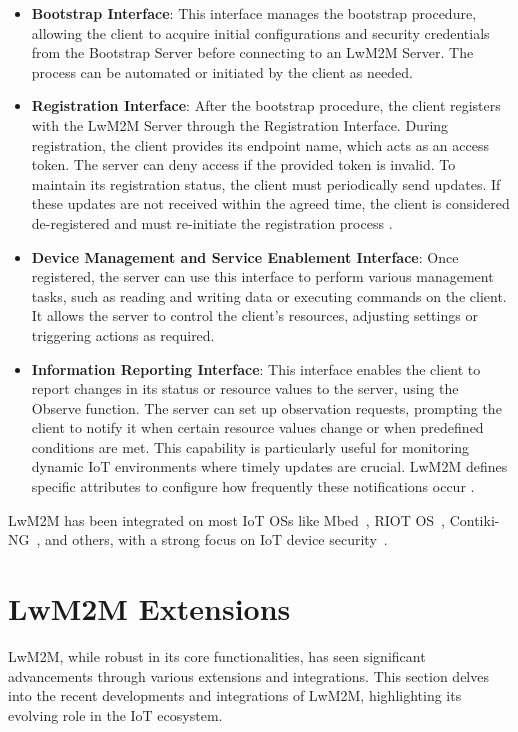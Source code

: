 \documentclass[11pt,sigconf]{iabart}
\begin{document}
\begin{itemize}
    \item \textbf{Bootstrap Interface}: This interface manages the bootstrap procedure, allowing the client to acquire initial configurations and security credentials from the Bootstrap Server before connecting to an LwM2M Server. The process can be automated or initiated by the client as needed.
    \item \textbf{Registration Interface}: After the bootstrap procedure, the client registers with the LwM2M Server through the Registration Interface. During registration, the client provides its endpoint name, which acts as an access token. The server can deny access if the provided token is invalid. To maintain its registration status, the client must periodically send updates. If these updates are not received within the agreed time, the client is considered de-registered and must re-initiate the registration process \cite{pop00006}.
    \item \textbf{Device Management and Service Enablement Interface}: Once registered, the server can use this interface to perform various management tasks, such as reading and writing data or executing commands on the client. It allows the server to control the client's resources, adjusting settings or triggering actions as required.
    \item \textbf{Information Reporting Interface}: This interface enables the client to report changes in its status or resource values to the server, using the Observe function. The server can set up observation requests, prompting the client to notify it when certain resource values change or when predefined conditions are met. This capability is particularly useful for monitoring dynamic IoT environments where timely updates are crucial. LwM2M defines specific attributes to configure how frequently these notifications occur \cite{pop00006}.
\end{itemize}

LwM2M has been integrated on most IoT OSs like Mbed~\cite{mbed}, RIOT OS~\cite{riot_os}, Contiki-NG~\cite{contiki_ng}, and others, with a strong focus on IoT device security~\cite{pop00010}.

\section{LwM2M Extensions} \label{extensions}

LwM2M, while robust in its core functionalities, has seen significant advancements through various extensions and integrations. This section delves into the recent developments and integrations of LwM2M, highlighting its evolving role in the IoT ecosystem.
\end{document}
